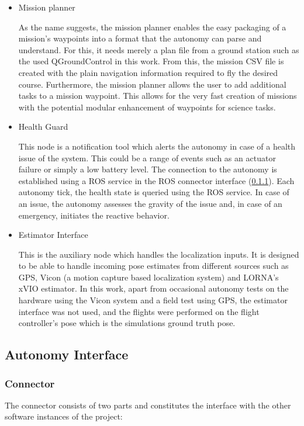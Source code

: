 \begin{itemize}
    \item Mission planner

    As the name suggests, the mission planner enables the easy packaging of a mission's waypoints into a format that the autonomy can parse and understand. For this, it needs merely a plan file from a ground station such as the used QGroundControl in this work. From this, the mission CSV file is created with the plain navigation information required to fly the desired course. Furthermore, the mission planner allows the user to add additional tasks to a mission waypoint. This allows for the very fast creation of missions with the potential modular enhancement of waypoints for science tasks.
    \item Health Guard
    
    This node is a notification tool which alerts the autonomy in case of a health issue of the system. This could be a range of events such as an actuator failure or simply a low battery level. The connection to the autonomy is established using a ROS service in the ROS connector interface (\ref{subsubsec:connector}). Each autonomy tick, the health state is queried using the ROS service. In case of an issue, the autonomy assesses the gravity of the issue and, in case of an emergency, initiates the reactive behavior.

    \item Estimator Interface
    
    This is the auxiliary node which handles the localization inputs. It is designed to be able to handle incoming pose estimates from different sources such as GPS, Vicon (a motion capture based localization system) and LORNA's xVIO estimator. In this work, apart from occasional autonomy tests on the hardware using the Vicon system and a field test using GPS, the estimator interface was not used, and the flights were performed on the flight controller's pose which is the simulations ground truth pose.
\end{itemize}

\subsection{Autonomy Interface}
\subsubsection{Connector}\label{subsubsec:connector}

The connector consists of two parts and constitutes the interface with the other software instances of the project:

